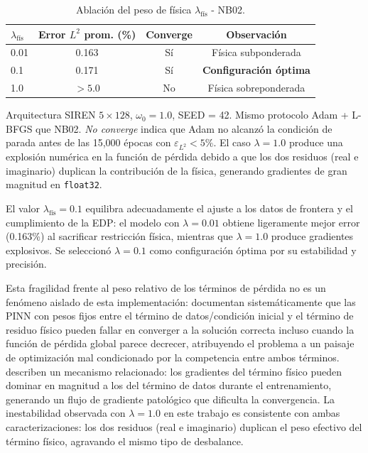 \begin{table}[htbp]
\centering
\begin{threeparttable}
\caption{Ablación del peso de física $\lambda_\text{fís}$ - NB02.}
\label{tab:ablacion_lambda}
\begin{tabular}{lccc}
\toprule
$\lambda_\text{fís}$ & Error $L^2$ prom. (\%) & Converge & Observación \\
\midrule
0.01  & 0.163  & Sí & Física subponderada \\
0.1   & 0.171  & Sí & \textbf{Configuración óptima} \\
1.0   & $>5.0$ & No & Física sobreponderada \\
\bottomrule
\end{tabular}
\begin{tablenotes}\small
    \item Arquitectura SIREN $5 \times 128$, $\omega_0 = 1.0$, SEED = 42.
    Mismo protocolo Adam + L-BFGS que NB02.
    \textit{No converge} indica que Adam no alcanzó la condición de parada
    antes de las 15{,}000 épocas con $\varepsilon_{L^2} < 5\%$. El caso
    $\lambda = 1.0$ produce una explosión numérica en la función de pérdida
    debido a que los dos residuos (real e imaginario) duplican la contribución
    de la física, generando gradientes de gran magnitud en \texttt{float32}.
\end{tablenotes}
\end{threeparttable}
\end{table}

El valor $\lambda_\text{fís} = 0.1$ equilibra adecuadamente el ajuste a los
datos de frontera y el cumplimiento de la EDP: el modelo con $\lambda = 0.01$
obtiene ligeramente mejor error (0.163\%) al sacrificar restricción física,
mientras que $\lambda = 1.0$ produce gradientes explosivos. Se seleccionó
$\lambda = 0.1$ como configuración óptima por su estabilidad y precisión.

Esta fragilidad frente al peso relativo de los términos de pérdida no es un
fenómeno aislado de esta implementación: \textcite{krishnapriyan2021characterizing}
documentan sistemáticamente que las PINN con pesos fijos entre el término de
datos/condición inicial y el término de residuo físico pueden fallar en
converger a la solución correcta incluso cuando la función de pérdida global
parece decrecer, atribuyendo el problema a un paisaje de optimización mal
condicionado por la competencia entre ambos términos. \textcite{wang2021failure}
describen un mecanismo relacionado: los gradientes del término físico pueden
dominar en magnitud a los del término de datos durante el entrenamiento,
generando un flujo de gradiente patológico que dificulta la convergencia. La
inestabilidad observada con $\lambda = 1.0$ en este trabajo es consistente
con ambas caracterizaciones: los dos residuos (real e imaginario) duplican el
peso efectivo del término físico, agravando el mismo tipo de desbalance.

